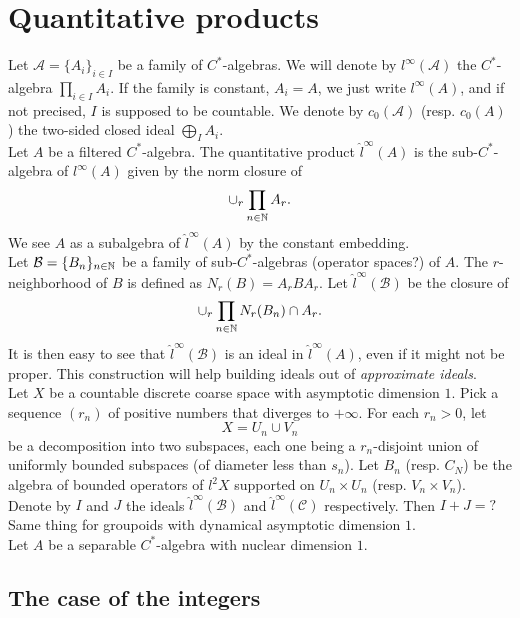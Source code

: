 \section{Quantitative products}

Let $\mathcal A=\{ A_i \}_{i\in I}$ be a family of $C^*$-algebras. We will denote by $l^\infty (\mathcal A)$ the $C^*$-algebra $\prod_{i\in I} A_i$. If the family is constant, $A_i=A$, we just write $l^\infty (A)$, and if not precised, $I $ is supposed to be countable. We denote by $c_0(\mathcal A)$ (resp. $c_0(A)$) the two-sided closed ideal $\bigoplus_I A_i$.\\

Let $A$ be a filtered $C^*$-algebra. The quantitative product $\hat l^\infty(A)$ is the sub-$C^*$-algebra of $l^\infty(A)$ given by the norm closure of  
\[ \cup_r \prod_{n\in \mathbb N} A_r. \]
We see $A$ as a subalgebra of $\hat l^\infty (A)$ by the constant embedding.\\

Let $\mathcal B =\{ B_n \}_{n\in \mathbb N}$ be a family of sub-$C^*$-algebras (operator spaces?) of $A$. The $r$-neighborhood of $B$ is defined as $N_r(B)=A_r B A_r$. Let $\hat l^\infty (\mathcal B)$ be the closure of
\[\cup_r \prod_{n\in\mathbb N} N_r(B_n) \cap A_r. \]
It is then easy to see that $\hat l^\infty (\mathcal B)$ is an ideal in $\hat l^\infty (A)$, even if it might not be proper. This construction will help building ideals out of \textit{approximate ideals}.\\

Let $X$ be a countable discrete coarse space with asymptotic dimension $1$. Pick a sequence $(r_n)$ of positive numbers that diverges to $+\infty$. For each $r_n>0$, let 
\[X = U_n \cup V_n\]
be a decomposition into two subspaces, each one being a $r_n$-disjoint union of uniformly bounded subspaces (of diameter less than $s_n$). Let $B_n$ (resp. $C_N$) be the algebra of bounded operators of $l^2 X$ supported on $U_n\times U_n$ (resp. $V_n\times V_n$). Denote by $I$ and $J$ the ideals $\hat l^\infty (\mathcal B)$ and $\hat l^\infty (\mathcal C)$ respectively. Then $I+J = ?$\\

Same thing for groupoids with dynamical asymptotic dimension $1$.\\

Let $A$ be a separable $C^*$-algebra with nuclear dimension $1$. \\

\subsection{The case of the integers}

